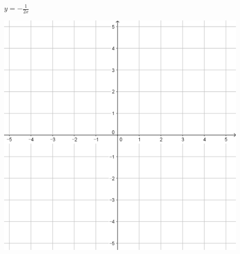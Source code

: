 \documentclass{oblivoir}
\begin{document}
\begin{minipage}{0.45\textwidth}\centering
\(y=-\frac1{2x}\)
\par\bigskip\includegraphics[width=0.9\textwidth]{55}
\end{minipage}\bigskip\bigskip\par
\end{document}
